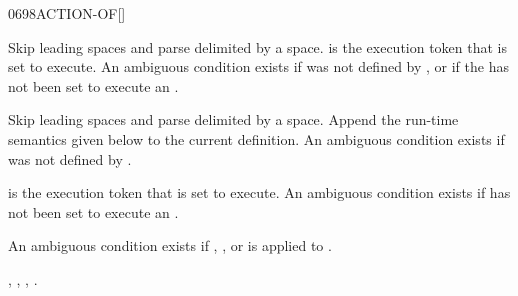 \begin{worddef}{0698}{ACTION-OF}[]%
\interpret

	Skip leading spaces and parse  delimited by a space.
	 is the execution token that  is set to execute.
	An ambiguous condition exists if  was not defined by
	, or if the  has not been set to execute an
	.

\compile

	Skip leading spaces and parse  delimited by a space.
	Append the run-time semantics given below to the current
	definition.  An ambiguous condition exists if 
	was not defined by .

\runtime

	 is the execution token that  is set to execute.
	An ambiguous condition exists if  has not been
	set to execute an .

	An ambiguous condition exists if , \word{[COMPILE]},
	\word{[']} or  is applied to .

\see {},
	,
	,
	.

	\begin{implement} %
		\word{:}  \\
		\tab {}   \\
		\tab[2]  \word{[']}   \\
		\tab {} \\
		\tab[2]   \\
		\tab {} \word{;} 
	\end{implement}

	\begin{testing} %
		 \\

		 \\
		 \\
		 \\

		 \\
		 \\
		 \\
	\end{testing}
\end{worddef}


